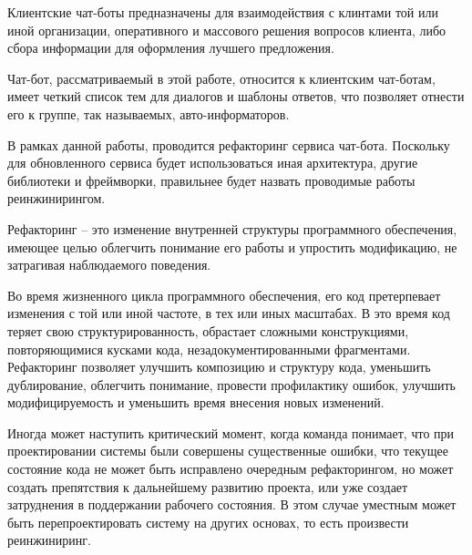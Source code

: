 Клиентские чат-боты предназначены для взаимодействия с клинтами той или иной организации,
оперативного и массового решения вопросов клиента, либо сбора информации
для оформления лучшего предложения.

Чат-бот, рассматриваемый в этой работе, относится к клиентским чат-ботам,
имеет четкий список тем для диалогов и шаблоны ответов, что позволяет отнести
его к группе, так называемых, авто-информаторов.

В рамках данной работы, проводится рефакторинг сервиса чат-бота. Поскольку
для обновленного сервиса будет использоваться иная архитектура, другие библиотеки и
фреймворки, правильнее будет назвать проводимые работы реинжинирингом.

Рефакторинг -- это изменение внутренней структуры программного обеспечения,
имеющее целью облегчить понимание его работы и упростить модификацию,
не затрагивая наблюдаемого поведения. \cite{refactoring.fowler}

Во время жизненного цикла программного обеспечения, его код претерпевает изменения
с той или иной частоте, в тех или иных масштабах. В это время код теряет свою
структурированность, обрастает сложными конструкциями, повторяющимися кусками кода,
незадокументированными фрагментами.
Рефакторинг позволяет улучшить композицию и структуру кода, уменьшить дублирование,
облегчить понимание, провести профилактику ошибок, улучшить модифицируемость и
уменьшить время внесения новых изменений.

Иногда может наступить критический момент, когда команда понимает,
что при проектировании системы были совершены существенные ошибки,
что текущее состояние кода не может быть исправлено очередным рефакторингом,
но может создать препятствия к дальнейшему развитию проекта,
или уже создает затруднения в поддержании рабочего состояния.
В этом случае уместным может быть перепроектировать систему на других основах,
то есть произвести реинжиниринг.
